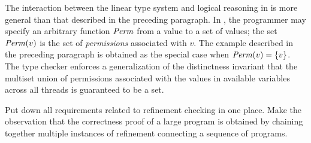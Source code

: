 The interaction between the linear type system and logical reasoning in \civl is more general than that described in the preceding paragraph.
In \civl, the programmer may specify an arbitrary function $\mathit{Perm}$ from a value to a set of values;
the set $\mathit{Perm}(v)$ is the set of {\em permissions\/} associated with $v$.
The example described in the preceding paragraph is obtained as the special case when $\mathit{Perm}(v) = \{v\}$.
The \civl type checker enforces a generalization of the distinctness invariant that 
the multiset union of permissions associated with the values in available variables across all threads is guaranteed to be a set.

Put down all requirements related to refinement checking in one place.
Make the observation that the correctness proof of a large program is obtained by chaining together
multiple instances of refinement connecting a sequence of programs.  



